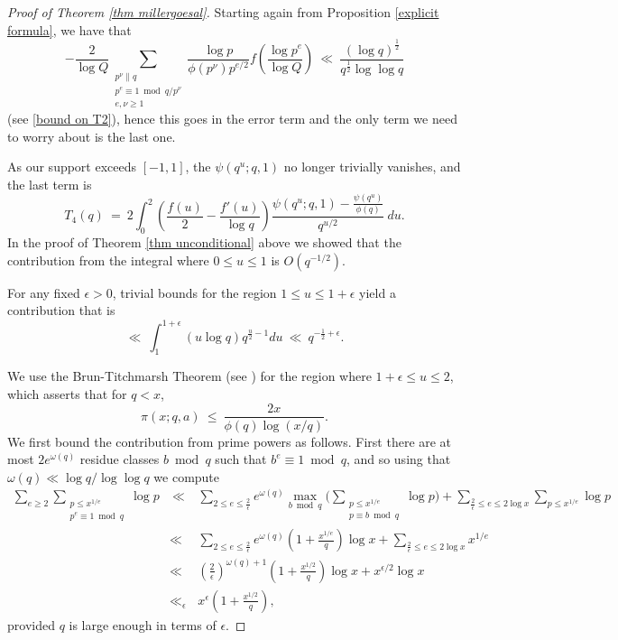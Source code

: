 \documentclass[12pt,reqno]{amsart}
\numberwithin{equation}{section}
\theoremstyle{plain}
\begin{document}
\begin{proof}[Proof of Theorem \ref{thm millergoesal}]
Starting again from Proposition \ref{explicit formula}, we have that
\begin{equation} -\frac 2{\log Q} \sum_{\substack{p^{\nu}\parallel q \\ p^e \equiv 1 \bmod q/p^{\nu} \\ e, \nu \geq 1}}\frac{\log p}{\phi(p^{\nu})p^{e/2}}f\left( \frac{\log p^{e}}{\log Q}\right)\ \ll\ \frac{(\log q)^{\frac 12}}{q^{\frac 12}\log\log q} \end{equation}
(see \eqref{bound on T2}), hence this goes in the error term and the only term we need to worry about is the last one.

As our support exceeds $[-1, 1]$, the $\psi(q^u;q,1)$ no longer trivially vanishes, and the last term is
\begin{equation} T_4(q) \ = \  2 \int_0^{2} \left(\frac {f(u)}2 -\frac {f'(u)}{\log q}\right)\frac{\psi(q^u;q,1)-\frac{\psi(q^u)}{\phi(q)}}{q^{u/2}}\ du.\end{equation} In the proof of Theorem \ref{thm unconditional} above we showed that the contribution from the integral where $0\leq u\leq 1$ is $O(q^{-1/2})$.

For any fixed $\epsilon > 0$, trivial bounds for the region $1\leq u \leq 1+\epsilon$ yield a contribution that is
\begin{equation} \ll\ \int_1^{1+\epsilon} (u\log q) q^{\frac u2-1}du \ \ll\ q^{-\frac 12+\epsilon}.\end{equation}

We use the Brun-Titchmarsh Theorem (see \cite{thelargesieve}) for the region where $1+\epsilon \leq u \leq 2$, which asserts that for $q<x$, \begin{equation} \pi(x;q,a) \ \leq\ \frac{2 x}{\phi(q)\log(x/q)}.\end{equation} We first bound the contribution from prime powers as follows. First there are at most $2e^{\omega(q)}$ residue classes $b\bmod q$ such that $b^e\equiv 1 \bmod q$, and so using that $\omega(q) \ll \log q/\log\log q$ we compute
\begin{eqnarray} \sum_{e\geq 2} \sum_{\substack{p\leq x^{1/e} \\ p^e \equiv 1 \bmod q}} \log p & \ \ll\ & \sum_{2\leq e \leq \frac 2{\epsilon}} e^{\omega(q)} \max_{b \bmod q}\Bigg(\sum_{\substack{p\leq x^{1/e} \\ p\equiv b \bmod q}}\log p \Bigg)+ \sum_{\frac 2{\epsilon} \leq e\leq 2\log x} \sum_{p\leq x^{1/e}}\log p \nonumber\\ & \ll & \sum_{2\leq e\leq \frac 2{\epsilon}} e^{\omega(q)} \left( 1+\frac{x^{1/e}}q\right) \log x + \sum_{\frac 2{\epsilon} \leq e\leq 2\log x} x^{1/e}
\nonumber\\ &\ll & \left( \frac 2{\epsilon}\right)^{\omega(q)+1}\left(1+\frac{x^{1/2}}q\right) \log x+x^{\epsilon/2}\log x
\nonumber\\ &\ll_{\epsilon} & x^{\epsilon}\left(1+\frac{x^{1/2}}q\right),
\end{eqnarray}
provided $q$ is large enough in terms of $\epsilon$.


\end{proof}
\end{document}

